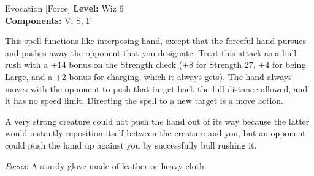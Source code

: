 {Evocation [Force]}
{
	\textbf{Level:}
	Wiz 6\\
	\textbf{Components:}
	V, S, F\\
}
{
	This spell functions like interposing hand, except that the forceful hand pursues and pushes away the opponent that you designate. Treat this attack as a bull rush with a +14 bonus on the Strength check (+8 for Strength 27, +4 for being Large, and a +2 bonus for charging, which it always gets). The hand always moves with the opponent to push that target back the full distance allowed, and it has no speed limit. Directing the spell to a new target is a move action.

	A very strong creature could not push the hand out of its way because the latter would instantly reposition itself between the creature and you, but an opponent could push the hand up against you by successfully bull rushing it.

	\textit{Focus}:
	A sturdy glove made of leather or heavy cloth.

}

